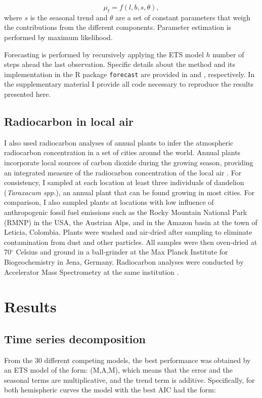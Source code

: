 \begin{equation}
\mu_t = f(l, b, s, \theta),
\end{equation}
where $s$ is the seasonal trend and $\theta$ are a set of constant parameters that weigh the contributions from the different components. Parameter estimation is performed by 
maximum likelihood. 

Forecasting is performed by recursively applying the ETS model $h$ number of steps ahead the last observation. Specific details about the method and its implementation in the R package {\tt forecast} are provided in \citet{Hyndman2008} and \citet{Hyndman2008JSS}, respectively. In the supplementary material I provide all code necessary to reproduce the results presented here.

\subsection{Radiocarbon in local air}
I also used radiocarbon analyses of annual plants to infer the atmospheric radiocarbon concentration in a set of cities around the world. Annual plants incorporate local sources of carbon dioxide during the growing season, providing an integrated measure of the radiocarbon concentration of the local air \citep{Hsueh2007GRL}. For consistency, I sampled at each location at least three individuals of dandelion ({\it Taraxacum spp.}), an annual plant that can be found growing in most cities. For comparison, I also sampled plants at locations with low influence of anthropogenic fossil fuel emissions such as the Rocky Mountain National Park (RMNP) in the USA, the Austrian Alps, and in the Amazon basin at the town of Leticia, Colombia. Plants were washed and air-dried after sampling to eliminate contamination from dust and other particles.   All samples were then oven-dried at 70$^{\circ}$ Celsius and ground in a ball-grinder at the Max Planck Institute for Biogeochemistry in Jena, Germany. Radiocarbon analyses were conducted by Accelerator Mass Spectrometry at the same institution \citep{Steinhof2004Radiocarbon}. 

\section{Results}
\subsection{Time series decomposition}
From the 30 different competing models, the best performance was obtained by an ETS model of the form: (M,A,M), which means that the 
error and the seasonal terms are multiplicative, and the trend term is additive. Specifically, for both hemispheric curves the model with
the best AIC had the form:

